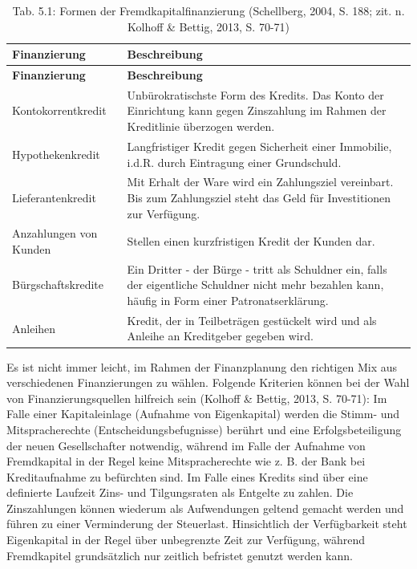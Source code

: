 \documentclass[
  letterpaper,
]{book}
\begin{document}
\begin{longtable}[]{@{}
  >{\raggedright\arraybackslash}p{}
  >{\raggedright\arraybackslash}p{}@{}}
\caption{Tab. 5.1: Formen der Fremdkapitalfinanzierung (Schellberg,
2004, S. 188; zit. n. Kolhoff \& Bettig, 2013, S. 70-71)}\tabularnewline
\toprule\noalign{}
\begin{minipage}[b]{\linewidth}\raggedright
\textbf{Finanzierung}
\end{minipage} & \begin{minipage}[b]{\linewidth}\raggedright
\textbf{Beschreibung}
\end{minipage} \\
\midrule\noalign{}
\endfirsthead
\toprule\noalign{}
\begin{minipage}[b]{\linewidth}\raggedright
\textbf{Finanzierung}
\end{minipage} & \begin{minipage}[b]{\linewidth}\raggedright
\textbf{Beschreibung}
\end{minipage} \\
\midrule\noalign{}
\endhead
\bottomrule\noalign{}
\endlastfoot
Kontokorrentkredit & Unbürokratischste Form des Kredits. Das Konto der
Einrichtung kann gegen Zinszahlung im Rahmen der Kreditlinie überzogen
werden. \\
Hypothekenkredit & Langfristiger Kredit gegen Sicherheit einer
Immobilie, i.d.R. durch Eintragung einer Grundschuld. \\
Lieferantenkredit & Mit Erhalt der Ware wird ein Zahlungsziel
vereinbart. Bis zum Zahlungsziel steht das Geld für Investitionen zur
Verfügung. \\
Anzahlungen von Kunden & Stellen einen kurzfristigen Kredit der Kunden
dar. \\
Bürgschaftskredite & Ein Dritter - der Bürge - tritt als Schuldner ein,
falls der eigentliche Schuldner nicht mehr bezahlen kann, häufig in Form
einer Patronatserklärung. \\
Anleihen & Kredit, der in Teilbeträgen gestückelt wird und als Anleihe
an Kreditgeber gegeben wird. \\
\end{longtable}

Es ist nicht immer leicht, im Rahmen der Finanzplanung den richtigen Mix
aus verschiedenen Finanzierungen zu wählen. Folgende Kriterien können
bei der Wahl von Finanzierungsquellen hilfreich sein (Kolhoff \& Bettig,
2013, S. 70-71): Im Falle einer Kapitaleinlage (Aufnahme von
Eigenkapital) werden die Stimm- und Mitspracherechte
(Entscheidungsbefugnisse) berührt und eine Erfolgsbeteiligung der neuen
Gesellschafter notwendig, während im Falle der Aufnahme von Fremdkapital
in der Regel keine Mitspracherechte wie z. B. der Bank bei
Kreditaufnahme zu befürchten sind. Im Falle eines Kredits sind über eine
definierte Laufzeit Zins- und Tilgungsraten als Entgelte zu zahlen. Die
Zinszahlungen können wiederum als Aufwendungen geltend gemacht werden
und führen zu einer Verminderung der Steuerlast. Hinsichtlich der
Verfügbarkeit steht Eigenkapital in der Regel über unbegrenzte Zeit zur
Verfügung, während Fremdkapitel grundsätzlich nur zeitlich befristet
genutzt werden kann.
\end{document}
